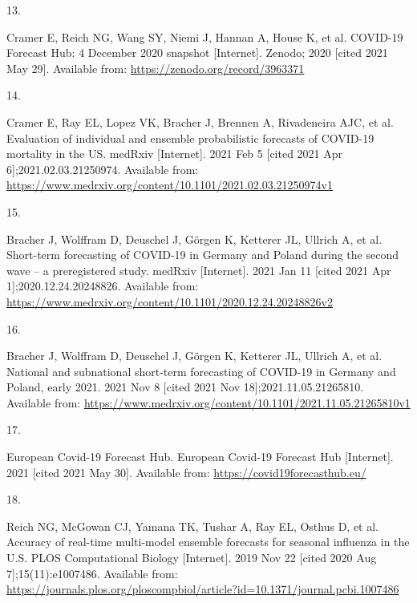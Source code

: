 \documentclass[
]{article}
\newlength{\cslhangindent}
\newlength{\csllabelwidth}
\newlength{\cslentryspacingunit} %
\newenvironment{CSLReferences}[2] %
 {%
  \setlength{\parindent}{0pt}
  \ifodd #1
  \let\oldpar\par
  \def\par{\hangindent=\cslhangindent\oldpar}
  \fi
  \setlength{\parskip}{#2\cslentryspacingunit}
 }%
 {}
\newcommand{\CSLLeftMargin}[1]{\parbox[t]{\csllabelwidth}{#1}}
\newcommand{\CSLRightInline}[1]{\parbox[t]{\linewidth - \csllabelwidth}{#1}\break}
\begin{document}
\begin{CSLReferences}{0}{0}
\leavevmode{}%
\CSLLeftMargin{13. }
\CSLRightInline{Cramer E, Reich NG, Wang SY, Niemi J, Hannan A, House K, et al. {COVID-19 Forecast Hub}: 4 {December} 2020 snapshot {[}Internet{]}. {Zenodo}; 2020 {[}cited 2021 May 29{]}. Available from: \url{https://zenodo.org/record/3963371}}

\leavevmode{}%
\CSLLeftMargin{14. }
\CSLRightInline{Cramer E, Ray EL, Lopez VK, Bracher J, Brennen A, Rivadeneira AJC, et al. Evaluation of individual and ensemble probabilistic forecasts of {COVID-19} mortality in the {US}. medRxiv {[}Internet{]}. 2021 Feb 5 {[}cited 2021 Apr 6{]};2021.02.03.21250974. Available from: \url{https://www.medrxiv.org/content/10.1101/2021.02.03.21250974v1}}

\leavevmode{}%
\CSLLeftMargin{15. }
\CSLRightInline{Bracher J, Wolffram D, Deuschel J, Görgen K, Ketterer JL, Ullrich A, et al. Short-term forecasting of {COVID-19} in {Germany} and {Poland} during the second wave -- a preregistered study. medRxiv {[}Internet{]}. 2021 Jan 11 {[}cited 2021 Apr 1{]};2020.12.24.20248826. Available from: \url{https://www.medrxiv.org/content/10.1101/2020.12.24.20248826v2}}

\leavevmode{}%
\CSLLeftMargin{16. }
\CSLRightInline{Bracher J, Wolffram D, Deuschel J, Görgen K, Ketterer JL, Ullrich A, et al. National and subnational short-term forecasting of {COVID-19} in {Germany} and {Poland}, early 2021. 2021 Nov 8 {[}cited 2021 Nov 18{]};2021.11.05.21265810. Available from: \url{https://www.medrxiv.org/content/10.1101/2021.11.05.21265810v1}}

\leavevmode{}%
\CSLLeftMargin{17. }
\CSLRightInline{European Covid-19 Forecast Hub. European {Covid-19 Forecast Hub} {[}Internet{]}. 2021 {[}cited 2021 May 30{]}. Available from: \url{https://covid19forecasthub.eu/}}

\leavevmode{}%
\CSLLeftMargin{18. }
\CSLRightInline{Reich NG, McGowan CJ, Yamana TK, Tushar A, Ray EL, Osthus D, et al. Accuracy of real-time multi-model ensemble forecasts for seasonal influenza in the {U}.{S}. PLOS Computational Biology {[}Internet{]}. 2019 Nov 22 {[}cited 2020 Aug 7{]};15(11):e1007486. Available from: \url{https://journals.plos.org/ploscompbiol/article?id=10.1371/journal.pcbi.1007486}}


\end{CSLReferences}
\end{document}
